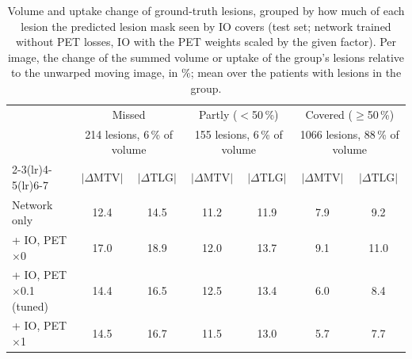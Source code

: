 \begin{table}[t]
\centering
\caption{Volume and uptake change of ground-truth lesions, grouped by how much of each lesion the predicted lesion mask seen by IO covers (test set; network trained without PET losses, IO with the PET weights scaled by the given factor).
 Per image, the change of the summed volume or uptake of the group's lesions relative to the unwarped moving image, in \%; mean over the patients with lesions in the group.}
\label{tab:detection_groups}
\scriptsize
\setlength{\tabcolsep}{3pt}
\begin{tabular}{lcccccc}
\toprule
 & \multicolumn{2}{c}{Missed} & \multicolumn{2}{c}{Partly ($<$50\,\%)} & \multicolumn{2}{c}{Covered ($\geq$50\,\%)} \\
 & \multicolumn{2}{c}{\tiny 214 lesions, 6\,\% of volume} & \multicolumn{2}{c}{\tiny 155 lesions, 6\,\% of volume} & \multicolumn{2}{c}{\tiny 1066 lesions, 88\,\% of volume} \\
\cmidrule(lr){2-3}\cmidrule(lr){4-5}\cmidrule(lr){6-7}
 & $|\Delta\mathrm{MTV}|$ & $|\Delta\mathrm{TLG}|$ & $|\Delta\mathrm{MTV}|$ & $|\Delta\mathrm{TLG}|$ & $|\Delta\mathrm{MTV}|$ & $|\Delta\mathrm{TLG}|$ \\
\midrule
Network only & 12.4 & 14.5 & 11.2 & 11.9 & 7.9 & 9.2 \\
\midrule
+ IO, PET $\times$0 & 17.0 & 18.9 & 12.0 & 13.7 & 9.1 & 11.0 \\
+ IO, PET $\times$0.1 (tuned) & 14.4 & 16.5 & 12.5 & 13.4 & 6.0 & 8.4 \\
+ IO, PET $\times$1 & 14.5 & 16.7 & 11.5 & 13.0 & 5.7 & 7.7 \\
\bottomrule
\end{tabular}
\end{table}
